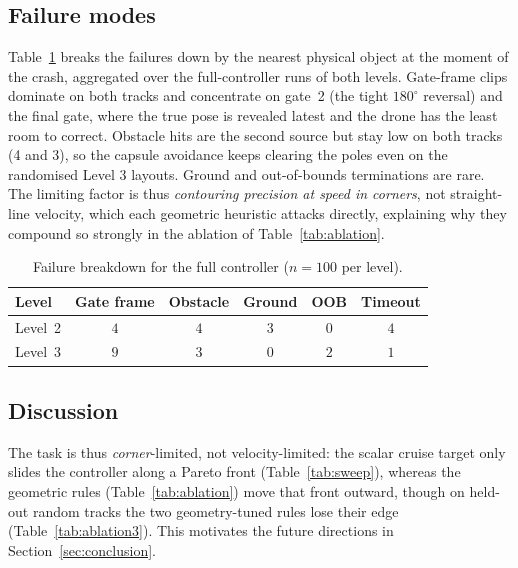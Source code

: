 \documentclass[conference]{IEEEtran}
\begin{document}
\subsection{Failure modes}
Table~\ref{tab:crash} breaks the failures down by the nearest physical object at
the moment of the crash, aggregated over the full-controller runs of both levels.
Gate-frame clips dominate on both tracks and concentrate on gate~2 (the tight
$180^\circ$ reversal) and the final gate, where the true pose is revealed latest
and the drone has the least room to correct. Obstacle hits are the second source but stay low on both tracks (4 and 3), so the capsule avoidance keeps clearing the poles even on the randomised Level 3 layouts. Ground and
out-of-bounds terminations are rare. The limiting factor is thus
\emph{contouring precision at speed in corners}, not straight-line velocity,
which each geometric heuristic attacks directly, explaining why they compound so
strongly in the ablation of Table~\ref{tab:ablation}.

\begin{table}[t]
\centering
\caption{Failure breakdown for the full controller ($n=100$ per level).}
\label{tab:crash}
\begin{tabular}{lccccc}
\toprule
Level & Gate frame & Obstacle & Ground & OOB & Timeout\\
\midrule
Level~2 & $4$ & $4$ & $3$ & $0$ & $4$\\
Level~3 & $9$ & $3$ & $0$ & $2$ & $1$\\
\bottomrule
\end{tabular}
\end{table}

\subsection{Discussion}
The task is thus \emph{corner}-limited, not velocity-limited: the scalar cruise
target only slides the controller along a Pareto front (Table~\ref{tab:sweep}),
whereas the geometric rules (Table~\ref{tab:ablation}) move that front outward,
though on held-out random tracks the two geometry-tuned rules lose their edge
(Table~\ref{tab:ablation3}). This motivates the future directions in
Section~\ref{sec:conclusion}.
\end{document}
